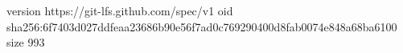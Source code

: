 version https://git-lfs.github.com/spec/v1
oid sha256:6f7403d027ddfeaa23686b90e56f7ad0c769290400d8fab0074e848a68ba6100
size 993
